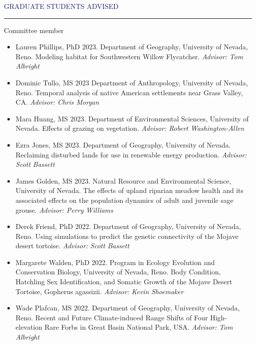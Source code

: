 \documentclass{resume} %
\renewenvironment{rSection}[1]{
\sectionskip
\textcolor{MidnightBlue}{\MakeUppercase{#1}}
\sectionlineskip
\hrule
\begin{list}{}{
\setlength{\leftmargin}{1.5em}
}
\item[]
}{
\end{list}
}
\begin{document}
\begin{rSection}{Graduate Students Advised}
\begin{rSubsection}{Committee member}{}{}{}
\begin{itemize}
  \item[] Lauren Phillips, PhD 2023. Department of Geography, University of Nevada, Reno. Modeling habitat for Southwestern Willow Flycatcher. \textit{Advisor: Tom Albright}
  
\item[] Dominic Tullo, MS 2023 Department of Anthropology, University of Nevada, Reno. Temporal analysis of native American settlements near Grass Valley, CA. \textit{Advisor: Chris Morgan}

\item[] Mara Huang, MS 2023. Department of Environmental Sciences, University of Nevada. Effects of grazing on vegetation. \textit{Advisor: Robert Washington-Allen}

\item[] Ezra Jones, MS 2023. Department of Geography, University of Nevada. Reclaiming disturbed lands for use in renewable energy production. \textit{Advisor: Scott Bassett}

\item[] James Golden, MS 2023. Natural Resource and Environmental Science, University of Nevada. The effects of upland riparian meadow health and its associated effects on the population dynamics of adult and juvenile sage grouse. \textit{Advisor: Perry Williams}
  
  \item[] Derek Friend, PhD 2022. Department of Geography, University of Nevada, Reno. Using simulations to predict the genetic connectivity of the Mojave desert tortoise. \textit{Advisor: Scott Bassett}
  
  \item[] Margarete Walden, PhD 2022. Program in Ecology Evolution and Conservation Biology, University of Nevada, Reno. Body Condition, Hatchling Sex Identification, and Somatic Growth of the Mojave Desert Tortoise, Gopherus agassizii. \textit{Advisor: Kevin Shoemaker}
   
   \item[] Wade Plafcan, MS 2022. Department of Geography, University of Nevada, Reno. Recent and Future Climate-induced Range Shifts of Four High-elevation Rare Forbs in Great Basin National Park, USA. \textit{Advisor: Tom Albright}
   

\end{itemize}
\end{rSubsection}
\end{rSection}
\end{document}
